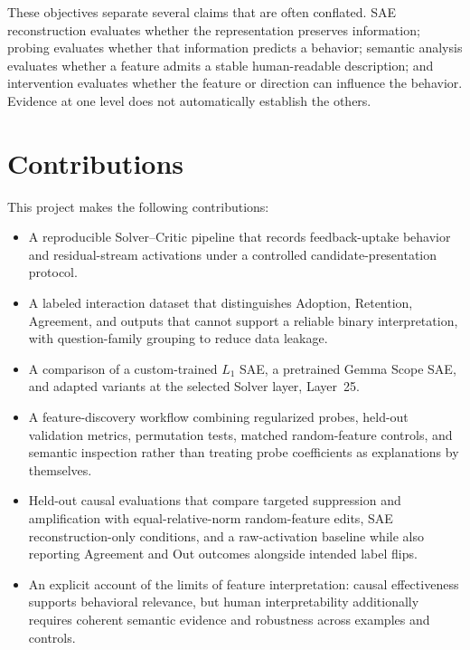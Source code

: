 These objectives separate several claims that are often conflated. SAE
reconstruction evaluates whether the representation preserves information;
probing evaluates whether that information predicts a behavior; semantic
analysis evaluates whether a feature admits a stable human-readable
description; and intervention evaluates whether the feature or direction can
influence the behavior. Evidence at one level does not automatically establish
the others.

\section{Contributions}

This project makes the following contributions:

\begin{itemize}
    \item A reproducible Solver--Critic pipeline that records feedback-uptake
    behavior and residual-stream activations under a controlled
    candidate-presentation protocol.

    \item A labeled interaction dataset that distinguishes Adoption,
    Retention, Agreement, and outputs that cannot support a reliable binary
    interpretation, with question-family grouping to reduce data leakage.

    \item A comparison of a custom-trained $L_1$ SAE, a pretrained Gemma Scope
    SAE, and adapted variants at the selected Solver layer, Layer~25.

    \item A feature-discovery workflow combining regularized probes,
    held-out validation metrics, permutation tests, matched random-feature
    controls, and semantic inspection rather than treating probe coefficients
    as explanations by themselves.

    \item Held-out causal evaluations that compare targeted suppression and
    amplification with equal-relative-norm random-feature edits, SAE
    reconstruction-only conditions, and a raw-activation baseline while also
    reporting Agreement and Out outcomes alongside intended label flips.

    \item An explicit account of the limits of feature interpretation: causal
    effectiveness supports behavioral relevance, but human interpretability
    additionally requires coherent semantic evidence and robustness across
    examples and controls.
\end{itemize}

